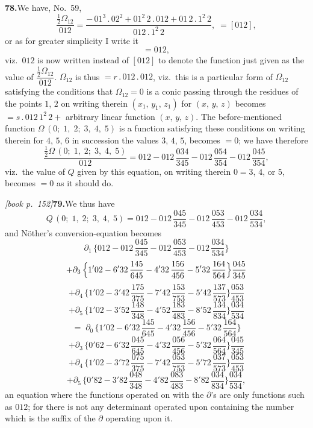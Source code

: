 \documentclass[11pt,a4paper]{article}
\theoremstyle{plain}
\theoremstyle{definition}
\theoremstyle{remark}
\begin{document}
\medskip\noindent\textbf{78.}\quad We have, No.\ 59,
\[
\frac{\tfrac{1}{2}\Omega_{12}}{012} = \frac{-\,01^{3}\,.\,02^{2} + 01^{2}\,2\,.\,012 + 01\,2\,.\,1^{2}\,2}{012\,.\,1^{2}\,2},\;= [012],
\]
or as for greater simplicity I write it
\[
= 012,
\]
viz.\ $012$ is now written instead of $[012]$ to denote the function just given as the value of $\dfrac{\tfrac{1}{2}\Omega_{12}}{012}$. $\Omega_{12}$ is thus $= r\,.\,012\,.\,012$, viz.\ this is a particular form of $\Omega_{12}$ satisfying the conditions that $\Omega_{12} = 0$ is a conic passing through the residues of the points $1$, $2$ on writing therein $(x_1,\,y_1,\,z_1)$ for $(x,\,y,\,z)$ becomes $= s\,.\,012\,1^{2}\,2 +$ arbitrary linear function $(x,\,y,\,z)$. The before-mentioned function $\Omega\,(0;\;1,\;2;\;3,\;4,\;5)$ is a function satisfying these conditions on writing therein for $4$, $5$, $6$ in succession the values $3$, $4$, $5$, becomes $= 0$; we have therefore
\[
\frac{\tfrac{1}{2}\Omega\,(0;\;1,\;2;\;3,\;4,\;5)}{012} = 012 - 012\,\frac{034}{345} - 012\,\frac{054}{354} - 012\,\frac{045}{354},
\]
viz.\ the value of $Q$ given by this equation, on writing therein $0 = 3$, $4$, or $5$, becomes $= 0$ as it should do.

\medskip\noindent\textit{[book p.~152]}\quad \textbf{79.}\quad We thus have
\[
Q\,(0;\;1,\;2;\;3,\;4,\;5) = 012 - 012\,\frac{045}{345} - 012\,\frac{053}{453} - 012\,\frac{034}{534},
\]
and Nöther's conversion-equation becomes
\[
\partial_1\,\bigl\{012 - 012\,\frac{045}{345} - 012\,\frac{053}{453} - 012\,\frac{034}{534}\bigr\}
\]
\[
+ \partial_3\,\Bigl\{1'02 - 6'32\,\frac{145}{645} - 4'32\,\frac{156}{456} - 5'32\,\frac{164}{564}\Bigr\}\frac{045}{345}
\]
\[
+ \partial_4\,\bigl\{1'02 - 3'42\,\frac{175}{375} - 7'42\,\frac{153}{753} - 5'42\,\frac{137}{573}\bigr\}\frac{053}{453}
\]
\[
+ \partial_5\,\bigl\{1'02 - 3'52\,\frac{148}{348} - 4'52\,\frac{183}{483} - 8'52\,\frac{134}{834}\bigr\}\frac{034}{534}
\]
\[
=\;\partial_0\,\bigl\{1'02 - 6'32\,\frac{145}{645} - 4'32\,\frac{156}{456} - 5'32\,\frac{164}{564}\bigr\}
\]
\[
+ \partial_3\,\bigl\{0'62 - 6'32\,\frac{045}{645} - 4'32\,\frac{056}{456} - 5'32\,\frac{064}{564}\bigr\}\frac{045}{345}
\]
\[
+ \partial_4\,\bigl\{1'02 - 3'72\,\frac{075}{375} - 7'42\,\frac{053}{753} - 5'72\,\frac{037}{573}\bigr\}\frac{053}{453}
\]
\[
+ \partial_5\,\bigl\{0'82 - 3'82\,\frac{048}{348} - 4'82\,\frac{083}{483} - 8'82\,\frac{034}{834}\bigr\}\frac{034}{534},
\]
an equation where the functions operated on with the $\partial$'s are only functions such as $012$; for there is not any determinant operated upon containing the number which is the suffix of the $\partial$ operating upon it.
\end{document}
